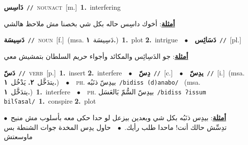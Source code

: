 \documentclass[10pt,a4paper,twoside]{article} %
\begin{document}
\begin{multicols}{2}
{\setlength\topsep{0pt}\textbf{\foreignlanguage{arabic}{دَاسِس}}\ {\color{gray}\texttt{//}\color{black}}\ \textsc{noun\textunderscore act}\ [m.]\ \textbf{1.}~interfering\  \begin{flushright}\color{gray}\foreignlanguage{arabic}{\textbf{\underline{\foreignlanguage{arabic}{أمثلة}}}: أخوك داسِس حاله بكل شي بخصنا مش ملاحظ هالشي}\end{flushright}\color{black}} \vspace{2mm}

{\setlength\topsep{0pt}\textbf{\foreignlanguage{arabic}{دَسِيسَة}}\ {\color{gray}\texttt{//}\color{black}}\ \textsc{noun}\ [f.]\ \color{gray}(msa. \foreignlanguage{arabic}{دَسِيسَة}~\foreignlanguage{arabic}{\textbf{١.}})\color{black}\ \textbf{1.}~plot  \textbf{2.}~intrigue\ \ $\bullet$\ \ \setlength\topsep{0pt}\textbf{\foreignlanguage{arabic}{دَسَائِس}}\ {\color{gray}\texttt{//}\color{black}}\ [pl.]\  \begin{flushright}\color{gray}\foreignlanguage{arabic}{\textbf{\underline{\foreignlanguage{arabic}{أمثلة}}}: جو الدَسِائِس والمكائد وأجواء حريم السلطان بتمشيش معي}\end{flushright}\color{black}} \vspace{2mm}

{\setlength\topsep{0pt}\textbf{\foreignlanguage{arabic}{دَسّ}}\ {\color{gray}\texttt{//}\color{black}}\ \textsc{verb}\ [p.]\ \textbf{1.}~insert  \textbf{2.}~interfere\ \ $\bullet$\ \ \setlength\topsep{0pt}\textbf{\foreignlanguage{arabic}{دِسّ}}\ {\color{gray}\texttt{//}\color{black}}\ [c.]\ \ $\bullet$\ \ \setlength\topsep{0pt}\textbf{\foreignlanguage{arabic}{يدِسّ}}\ {\color{gray}\texttt{//}\color{black}}\ [i.]\ \color{gray}(msa. \foreignlanguage{arabic}{يتدَخَّل}~\foreignlanguage{arabic}{\textbf{٢.}}  \foreignlanguage{arabic}{يَدْخُل}~\foreignlanguage{arabic}{\textbf{١.}})\color{black}\ \ $\bullet$\ \ \textsc{ph.} \color{gray} \foreignlanguage{arabic}{بيدِسّ ذنَبُه}\color{black}\ {\color{gray}\texttt{/{\sffamily bidiss (d)anabo}/}\color{black}}\ \color{gray} (msa. \foreignlanguage{arabic}{يتدَخَّل}~\foreignlanguage{arabic}{\textbf{١.}})\color{black}\ \textbf{1.}~interfere\ \ $\bullet$\ \ \textsc{ph.} \color{gray} \foreignlanguage{arabic}{بيدِسّ السُّمّ بَالعَسَل}\color{black}\ {\color{gray}\texttt{/{\sffamily bidiss ʔissum bilʕasal}/}\color{black}}\ \textbf{1.}~conspire  \textbf{2.}~plot\  \begin{flushright}\color{gray}\foreignlanguage{arabic}{\textbf{\underline{\foreignlanguage{arabic}{أمثلة}}}: بيدِس ذنَبُه بكل شي وبعدين بيزعل لو حدا حكى معه بأسلوب مش منيح\ $\bullet$\ \  تدِسِّش حالك أنت! ماحدا طلب رأيك.\ $\bullet$\ \  حاول يدِس المخدة جوات الشنطة بس ماوسعتش}\end{flushright}\color{black}} \vspace{2mm}


\end{multicols}
\end{document}
